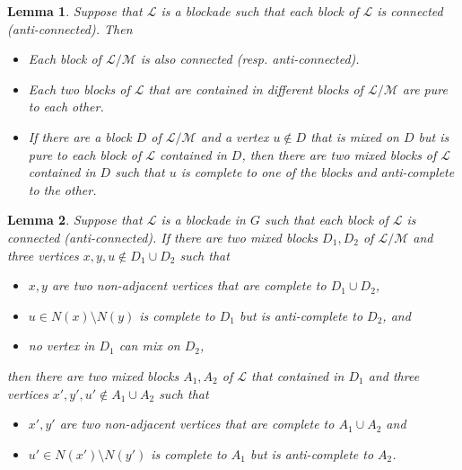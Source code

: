 \documentclass[10pt,a4paper]{amsart}
\newtheorem{lemma}{Lemma}
\begin{document}
        \begin{lemma}\label{clm:property of levels}
            Suppose that $\mathcal{L}$ is a blockade such that each block of $\mathcal{L}$ is connected (anti-connected). 
            Then  
            \begin{itemize}
                \item[$(1)$] Each block of $\mathcal{L}/\mathcal{M}$ is also connected (resp. anti-connected).
                
                \item[$(2)$] Each two blocks of $\mathcal{L}$ that are contained in different blocks of $\mathcal{L}/\mathcal{M}$ are pure to each other.
                
                \item[$(3)$] If there are a block $D$ of $\mathcal{L}/\mathcal{M}$ and a vertex $u\notin D$ that is mixed on $D$ but is pure to each block of $\mathcal{L}$ contained in $D$, then there are two mixed blocks of $\mathcal{L}$ contained in $D$ such that $u$ is complete to one of the blocks and anti-complete to the other.
    
            \end{itemize}
        \end{lemma}

        \begin{lemma}\label{clm:inductive}
            Suppose that $\mathcal{L}$ is a blockade in $G$ such that each block of $\mathcal{L}$ is connected (anti-connected). 
            If there are two mixed blocks $D_1,D_2$ of $\mathcal{L}/\mathcal{M}$ and three vertices $x,y,u\notin D_1\cup D_2$ such that 
            \begin{itemize}
                \item $x,y$ are two non-adjacent vertices that are complete to $D_1\cup D_2$,
                \item $u\in N(x)\setminus N(y)$ is complete to $D_1$ but is anti-complete to $D_2$, and
                \item no vertex in $D_1$ can mix on $D_2$,
            \end{itemize}
            then there are two mixed blocks $A_1,A_2$ of $\mathcal{L}$ that contained in $D_1$ and three vertices $x',y',u'\notin A_1\cup A_2$ such that 
            \begin{itemize}
                \item[$(1)$] $x',y'$ are two non-adjacent vertices that are complete to $A_1\cup A_2$ and
                \item[$(2)$] $u'\in N(x')\setminus N(y')$ is complete to $A_1$ but is anti-complete to $A_2$.  
            \end{itemize}
        \end{lemma}
\end{document}
